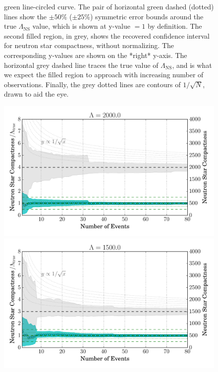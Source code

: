 \documentclass[aps,prd,amsmath,floats,floatfix, twocolumn,
superscriptaddress,nofootinbib,showpacs]{revtex4-1}
\newcommand{\lambdans}{\Lambda_\mathrm{NS}}
\begin{document}
\begin{figure}
{ green line-circled curve. The pair of horizontal green dashed (dotted)
 lines show the $\pm 50\%$ ($\pm 25\%$) symmetric error bounds around
 the true $\lambdans$ value, which is shown at y-value $=1$ by definition.
% 
 The second filled region, in grey, shows the recovered
 confidence interval for neutron star compactness, without normalizing.
 The corresponding y-values are shown on the *right* y-axis. The horizontal grey
 dashed line traces the true value of $\lambdans$, and is what we expect
 the filled region to approach with increasing number of observations.
%  
 Finally, the grey dotted lines are contours of $1/\sqrt{N}$, drawn to aid the eye.
}
\label{fig:TT_Lambda_vs_N_L800_CI90_0}
\end{figure}
%
% 
\begin{figure}
\centering    
\includegraphics[width=1.\columnwidth]{plots/FillBetweenNormErrorBarsLambda_vs_N_L2000.pdf}
\includegraphics[width=1.\columnwidth]{plots/FillBetweenNormErrorBarsLambda_vs_N_L1500.pdf}\\

\end{figure}
\end{document}

